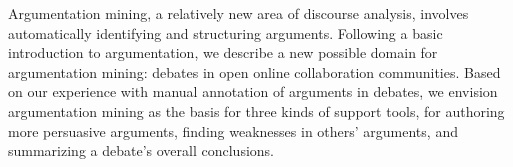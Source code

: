 Argumentation mining, a relatively new area of discourse analysis, involves automatically identifying and structuring arguments. Following a basic introduction to argumentation, we describe a new possible domain for argumentation mining: debates in open online collaboration communities. Based on our experience with manual annotation of arguments in debates, we envision argumentation mining as the basis for three kinds of support tools, for authoring more persuasive arguments, finding weaknesses in others' arguments, and summarizing a debate's overall conclusions.
